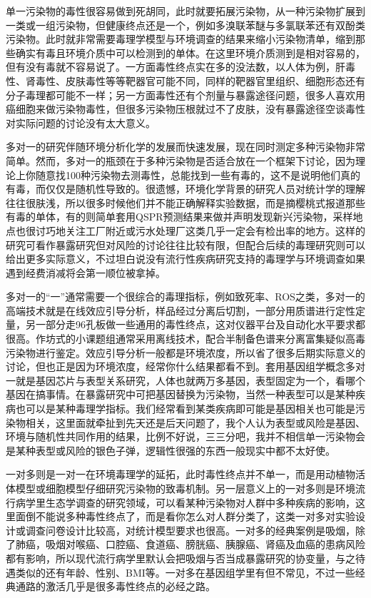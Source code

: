 \documentclass[
]{book}
\begin{document}
单一污染物的毒性很容易做到死胡同，此时就要拓展污染物，从一种污染物扩展到一类或一组污染物，但健康终点还是一个，例如多溴联苯醚与多氯联苯还有双酚类污染物。此时就非常需要毒理学模型与环境调查的结果来缩小污染物清单，缩到那些确实有毒且环境介质中可以检测到的单体。在这里环境介质测到是相对容易的，但有没有毒就不容易说了。一方面毒性终点实在多的没法数，以人体为例，肝毒性、肾毒性、皮肤毒性等等靶器官可能不同，同样的靶器官里组织、细胞形态还有分子毒理都可能不一样；另一方面毒性还有个剂量与暴露途径问题，很多人喜欢用癌细胞来做污染物毒性，但很多污染物压根就过不了皮肤，没有暴露途径空谈毒性对实际问题的讨论没有太大意义。

多对一的研究伴随环境分析化学的发展而快速发展，现在同时测定多种污染物非常简单。然而，多对一的瓶颈在于多种污染物是否适合放在一个框架下讨论，因为理论上你随意找100种污染物去测毒性，总能找到一些有毒的，这不是说明他们真的有毒，而仅仅是随机性导致的。很遗憾，环境化学背景的研究人员对统计学的理解往往很肤浅，所以很多时候他们并不能正确解释实验数据，而是摘樱桃式报道那些有毒的单体，有的则简单套用QSPR预测结果来做并声明发现新兴污染物，采样地点也很讨巧地关注工厂附近或污水处理厂这类几乎一定会有检出率的地方。这样的研究可看作暴露研究但对风险的讨论往往比较有限，但配合后续的毒理研究则可以给出更多实际意义，不过坦白说没有流行性疾病研究支持的毒理学与环境调查如果遇到经费消减将会第一顺位被拿掉。

多对一的``一''通常需要一个很综合的毒理指标，例如致死率、ROS之类，多对一的高端技术就是在线效应引导分析，样品经过分离后切割，一部分用质谱进行定性定量，另一部分走96孔板做一些通用的毒性终点，这对仪器平台及自动化水平要求都很高。作坊式的小课题组通常采用离线技术，配合半制备色谱来分离富集疑似高毒污染物进行鉴定。效应引导分析一般都是环境浓度，所以省了很多后期实际意义的讨论，但也正是因为环境浓度，经常你什么结果都看不到。套用基因组学概念多对一就是基因芯片与表型关系研究，人体也就两万多基因，表型固定为一个，看哪个基因在搞事情。在暴露研究中可把基因替换为污染物，当然一种表型可以是某种疾病也可以是某种毒理学指标。我们经常看到某类疾病即可能是基因相关也可能是污染物相关，这里面就牵扯到先天还是后天问题了，我个人认为表型或风险是基因、环境与随机性共同作用的结果，比例不好说，三三分吧，我并不相信单一污染物会是某种表型或风险的银色子弹，逻辑性很强的东西一般现实中都不太好使。

一对多则是一对一在环境毒理学的延拓，此时毒性终点并不单一，而是用动植物活体模型或细胞模型仔细研究污染物的致毒机制。另一层意义上的一对多则是环境流行病学里生态学调查的研究领域，可以看某种污染物对人群中多种疾病的影响，这里面倒不能说多种毒性终点了，而是看你怎么对人群分类了，这类一对多对实验设计或调查问卷设计比较高，对统计模型要求也很高。一对多的经典案例是吸烟，除了肺癌，吸烟对喉癌、口腔癌、食道癌、膀胱癌、胰腺癌、肾癌及血癌的患病风险都有影响，所以现代流行病学里默认会把吸烟与否当成暴露研究的协变量，与之待遇类似的还有年龄、性别、BMI等。一对多在基因组学里有但不常见，不过一些经典通路的激活几乎是很多毒性终点的必经之路。
\end{document}

